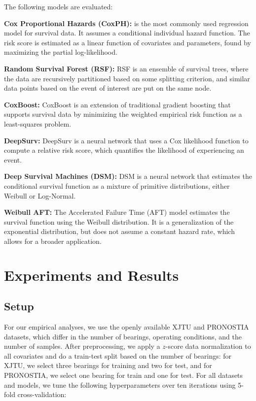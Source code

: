 \documentclass[letterpaper]{article} %
\begin{document}
The following models are evaluated:

\textbf{Cox Proportional Hazards (CoxPH):} \cite{cox_regression_1972} is the most commonly used regression model for survival data. It assumes a conditional individual hazard function. The risk score is estimated as a linear function of covariates and parameters, found by maximizing the partial log-likelihood.

\textbf{Random Survival Forest (RSF):} \cite{ishwaran_random_2008} RSF is an ensemble of survival trees, where the data are recursively partitioned based on some splitting criterion, and similar data points based on the event of interest are put on the same node.

\textbf{CoxBoost:} \cite{hothorn_survival_2005} CoxBoost is an extension of traditional gradient boosting that supports survival data by minimizing the weighted empirical risk function as a least-squares problem.

\textbf{DeepSurv:} \cite{katzman_deepsurv_2018} DeepSurv is a neural network that uses a Cox likelihood function to compute a relative risk score, which quantifies the likelihood of experiencing an event.

\textbf{Deep Survival Machines (DSM):} \cite{nagpal_deep_2021} DSM is a neural network that estimates the conditional survival function as a mixture of primitive distributions, either Weibull or Log-Normal.

\textbf{Weibull AFT:} \cite{lee_statistical_2013} The Accelerated Failure Time (AFT) model estimates the survival function using the Weibull distribution. It is a generalization of the exponential distribution, but does not assume a constant hazard rate, which allows for a broader application.





\section{Experiments and Results}

\subsection{Setup}

For our empirical analyses, we use the openly available XJTU and PRONOSTIA datasets, which differ in the number of bearings, operating conditions, and the number of samples. After preprocessing, we apply a $z$-score data normalization to all covariates and do a train-test split based on the number of bearings: for XJTU, we select three bearings for training and two for test, and for PRONOSTIA, we select one bearing for train and one for test. For all datasets and models, we tune the following hyperparameters over ten iterations using 5-fold cross-validation:
\end{document}
